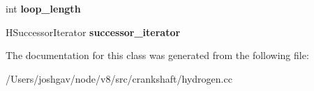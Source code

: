 \begin{DoxyCompactItemize}
\item 
int {\bfseries loop\+\_\+length}\hypertarget{classv8_1_1internal_1_1_postorder_processor_a0e2099dc559c117cf3e2890ba4964859}{}\label{classv8_1_1internal_1_1_postorder_processor_a0e2099dc559c117cf3e2890ba4964859}

\item 
H\+Successor\+Iterator {\bfseries successor\+\_\+iterator}\hypertarget{classv8_1_1internal_1_1_postorder_processor_a8e44b6e5cb6b773acf9dc1a2ed73b8f6}{}\label{classv8_1_1internal_1_1_postorder_processor_a8e44b6e5cb6b773acf9dc1a2ed73b8f6}

\end{DoxyCompactItemize}


The documentation for this class was generated from the following file\+:\begin{DoxyCompactItemize}
\item 
/\+Users/joshgav/node/v8/src/crankshaft/hydrogen.\+cc\end{DoxyCompactItemize}
